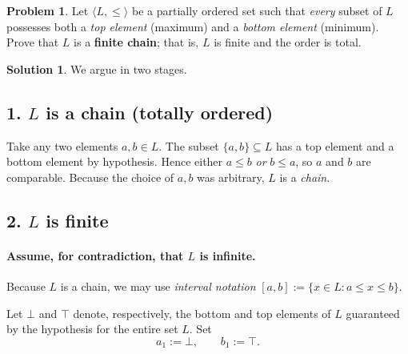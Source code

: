\documentclass[12pt]{article}
\theoremstyle{definition} %
\newtheorem{solution}{Solution}
\newtheorem{problem}{Problem}
\theoremstyle{plain} %
\begin{document}
        \begin{problem}
          Let $\langle L,\le\rangle$ be a partially ordered set such that
          \emph{every} subset of $L$ possesses both a \emph{top element}
          (maximum) and a \emph{bottom element} (minimum).
          Prove that $L$ is a \textbf{finite chain};
          that is, $L$ is finite and the order is total.
          \end{problem}
          
          \begin{solution}
          We argue in two stages.
          
          \subsection*{1.  $L$ is a chain (totally ordered)}
          Take any two elements $a,b\in L$.
          The subset $\{a,b\}\subseteq L$ has a top element
          and a bottom element by hypothesis.
          Hence either $a\le b$ \emph{or} $b\le a$,
          so $a$ and $b$ are comparable.
          Because the choice of $a,b$ was arbitrary, $L$ is a \emph{chain}.
          
          \subsection*{2.  $L$ is finite}
          
          \medskip
          \paragraph{Assume, for contradiction, that $L$ is infinite.}
          Because $L$ is a chain, we may use \emph{interval notation}
          \(
          [a,b]:=\{x\in L : a\le x\le b\}.
          \)
          
          \smallskip
          \noindent
          Let $\bot$ and $\top$ denote, respectively, the bottom
          and top elements of $L$ guaranteed by the hypothesis for the entire set $L$.
          Set
          \[
          a_{1}:=\bot,
          \qquad
          b_{1}:=\top.
          \]
          
          \medskip

\end{solution}
\end{document}
